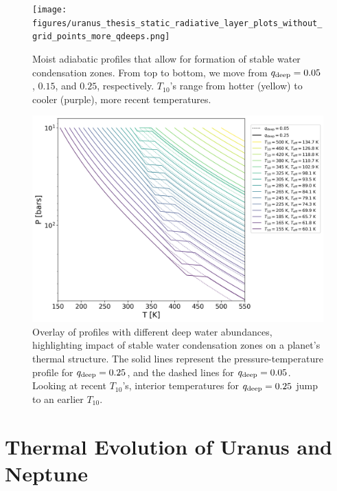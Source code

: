 \documentclass[11pt]{ucscthesisbs}
\begin{document}
\begin{figure}[ht]
 \centerline{
  \texttt{[image: figures/uranus\_thesis\_static\_radiative\_layer\_plots\_without\_grid\_points\_more\_qdeeps.png]}
 }{}
\caption[Formation of Radiative Zone]
{Moist adiabatic profiles that allow for formation of stable water condensation zones. From top to bottom, we move from $q_{\rm deep} = 0.05$, $0.15$, and $0.25$, respectively. $T_{10}$'s range from hotter (yellow) to cooler (purple), more recent temperatures.}
\label{fig:radiative}
\end{figure}

\begin{figure}[ht]{}
 \centerline{
  \includegraphics[scale=0.6]{figures/thesis_static_radiative_layer_plot_diff_qdeep_overlay.png}
 }
\caption[Impact of Radiative Layer on T10]
{Overlay of profiles with different deep water abundances, highlighting impact of stable water condensation zones on a planet's thermal structure. The solid lines represent the pressure-temperature profile for $q_{\rm deep} = 0.25$, and the dashed lines for $q_{\rm deep}=0.05$. Looking at recent $T_{10}$'s, interior temperatures for $q_{\rm deep} = 0.25$ jump to an earlier $T_{10}$.}
\label{fig:overlay}
\end{figure}


\section{Thermal Evolution of Uranus and Neptune}
\end{document}

